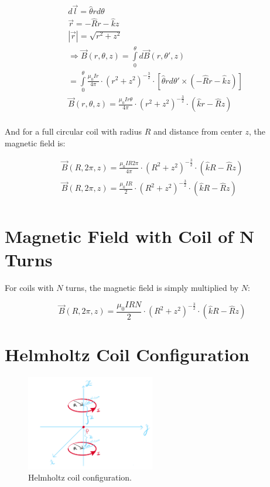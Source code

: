 \begin{align*}
    &d\vec{l} = \hat{\theta}rd\theta \\
    &\vec{r} = -\hat{R}r -\hat{k}z \\
    &|\vec{r}| = \sqrt{r^2 + z^2} \\
    &\Rightarrow \vec{B}(r, \theta, z) = \int\limits_0^\theta d\vec{B}(r, \theta', z) \\
    &= \int\limits_0^\theta \frac{\mu_0 I r}{4\pi}\cdot(r^2 + z^2)^{-\frac{3}{2}}\cdot\left[\hat{\theta}rd\theta' \times (-\hat{R}r - \hat{k}z)\right] \\
    &\boxed{\vec{B}(r, \theta, z) = \frac{\mu_0 I r \theta}{4\pi} \cdot(r^2 + z^2)^{-\frac{3}{2}} \cdot (\hat{k}r - \hat{R}z)} \\
\end{align*}

And for a full circular coil with radius $R$ and distance from center $z$, the magnetic field is:

\begin{align*}
    \vec{B}(R, 2\pi, z) = \frac{\mu_0 I R 2\pi}{4\pi} \cdot(R^2 + z^2)^{-\frac{3}{2}} \cdot (\hat{k}R - \hat{R}z) \\
    \boxed{\vec{B}(R, 2\pi, z) = \frac{\mu_0 I R}{2} \cdot(R^2 + z^2)^{-\frac{3}{2}} \cdot (\hat{k}R - \hat{R}z)} \\
\end{align*}


\section{Magnetic Field with Coil of N Turns}

For coils with \( N \) turns, the magnetic field is simply multiplied by \( N \):

\[ \boxed{\vec{B}(R, 2\pi, z) = \frac{\mu_0 I R N}{2} \cdot(R^2 + z^2)^{-\frac{3}{2}} \cdot (\hat{k}R - \hat{R}z)} \]

\newpage{}
\thispagestyle{plain}

\section{Helmholtz Coil Configuration}

\begin{figure}[h]
    \centering  
    \includegraphics[width=0.5\textwidth]{assets/helmholtz-coil-setup-hand-drawn.png}
    \caption{Helmholtz coil configuration.}
    \end{figure}

